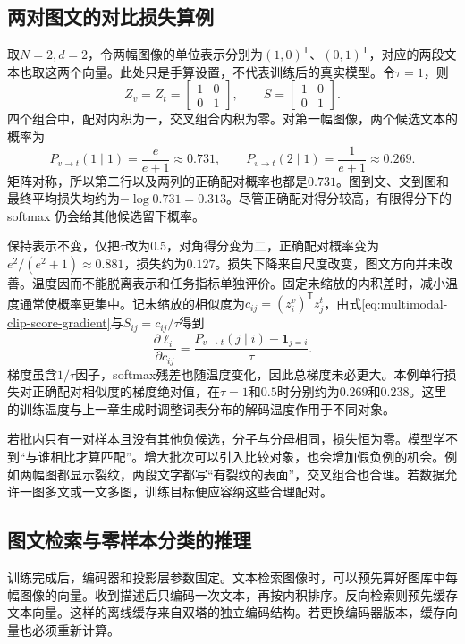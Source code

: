 \subsection{两对图文的对比损失算例}
取$N=2,d=2$，令两幅图像的单位表示分别为$(1,0)^{\mathsf T}$、$(0,1)^{\mathsf T}$，对应的两段文本也取这两个向量。此处只是手算设置，不代表训练后的真实模型。令$\tau=1$，则
\begin{equation}
 Z_v=Z_t=\begin{bmatrix}1&0\\0&1\end{bmatrix},\qquad
 S=\begin{bmatrix}1&0\\0&1\end{bmatrix}.
\end{equation}
四个组合中，配对内积为一，交叉组合内积为零。对第一幅图像，两个候选文本的概率为
\begin{equation}
 P_{v\to t}(1\mid1)=\frac{e}{e+1}\approx0.731,\qquad
 P_{v\to t}(2\mid1)=\frac1{e+1}\approx0.269.
\end{equation}
矩阵对称，所以第二行以及两列的正确配对概率也都是$0.731$。图到文、文到图和最终平均损失均约为$-\log0.731=0.313$。尽管正确配对得分较高，有限得分下的 softmax 仍会给其他候选留下概率。

保持表示不变，仅把$\tau$改为$0.5$，对角得分变为二，正确配对概率变为$e^2/(e^2+1)\approx0.881$，损失约为$0.127$。损失下降来自尺度改变，图文方向并未改善。温度因而不能脱离表示和任务指标单独评价。固定未缩放的内积差时，减小温度通常使概率更集中。记未缩放的相似度为$c_{ij}=(z_i^v)^{\mathsf T}z_j^t$，由式\eqref{eq:multimodal-clip-score-gradient}与$S_{ij}=c_{ij}/\tau$得到
\[
 \frac{\partial\ell_i}{\partial c_{ij}}
 =\frac{P_{v\to t}(j\mid i)-\mathbf1_{j=i}}{\tau}.
\]
梯度虽含$1/\tau$因子，softmax残差也随温度变化，因此总梯度未必更大。本例单行损失对正确配对相似度的梯度绝对值，在$\tau=1$和$0.5$时分别约为$0.269$和$0.238$。这里的训练温度与上一章生成时调整词表分布的解码温度作用于不同对象。

若批内只有一对样本且没有其他负候选，分子与分母相同，损失恒为零。模型学不到“与谁相比才算匹配”。增大批次可以引入比较对象，也会增加假负例的机会。例如两幅图都显示裂纹，两段文字都写“有裂纹的表面”，交叉组合也合理。若数据允许一图多文或一文多图，训练目标便应容纳这些合理配对。

\subsection{图文检索与零样本分类的推理}
训练完成后，编码器和投影层参数固定。文本检索图像时，可以预先算好图库中每幅图像的向量。收到描述后只编码一次文本，再按内积排序。反向检索则预先缓存文本向量。这样的离线缓存来自双塔的独立编码结构。若更换编码器版本，缓存向量也必须重新计算。

